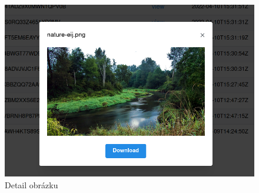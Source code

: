 \begin{figure}
    \centering
    \includegraphics[scale=0.5]{assets/images/image-detail}
    \caption{Detail obrázku}\label{fig:detail-obrazku}
\end{figure}
